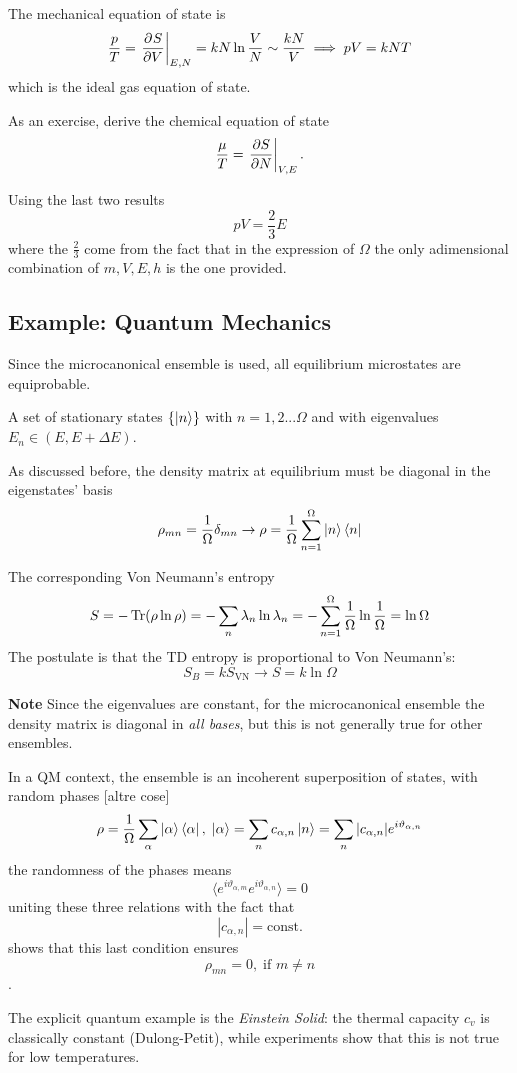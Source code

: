 The mechanical equation of state is
$$\frac{p}{T}=\eval{\pdv[]{S}{V}}_{E,N} = kN\ln \frac{V}{N}\sim \frac{kN}{V}
\implies pV = kNT$$
which is the ideal gas equation of state.

As an exercise, derive the chemical equation of state
$$\frac{\mu}{T} = \eval{\pdv{S}{N}}_{V,E}.$$

Using the last two results
$$pV = \frac{2}{3}E$$
where the $\frac{2}{3}$ come from the fact that in the expression of $\Omega$ the
only adimensional combination of $m,V,E,h$ is the one provided.
\subsection{Example: Quantum Mechanics}
Since the microcanonical ensemble is used, all equilibrium microstates are
equiprobable.

A set of stationary states $\left\{\ket{n}\right\}$ with $n=1,2...\Omega$ and
with eigenvalues $E_n\in\left(E,E+\Delta E\right)$.

As discussed before, the density matrix at equilibrium must be diagonal in the
eigenstates' basis
$$\rho_{mn} = \frac{1}{\Omega}\delta_{mn}\to \rho = \frac{1}{\Omega}
\sum_{n=1}^{\Omega}\ket{n}\bra{n}$$ 

The corresponding Von Neumann's entropy
$$S = -\Tr(\rho\ln\rho) = -\sum_{n}^{}\lambda_n\ln\lambda_n = 
-\sum_{n=1}^{\Omega}\frac{1}{\Omega}\ln\frac{1}{\Omega} = \ln\Omega $$
The postulate is that the TD entropy is proportional to Von Neumann's:
$$S_B = kS_\text{VN}\to S = k\ln\Omega$$

\textbf{Note} Since the eigenvalues are constant, for the microcanonical ensemble
the density matrix is diagonal in \textit{all bases}, but this is not generally
true for other ensembles.

In a QM context, the ensemble is an incoherent superposition of states, with
random phases [altre cose]
$$\rho = \frac{1}{\Omega} \sum_{\alpha}^{}\ket{\alpha}\bra{\alpha},\;\ket{\alpha}
=\sum_{n}^{} c_{\alpha,n}\ket{n} = \sum_{n}^{}|c_{\alpha,n}|
e^{i\vartheta_{\alpha,n}}$$
the randomness of the phases means
$$\langle e^{i\vartheta_{\alpha,m}}e^{i\vartheta_{\alpha,n}}\rangle =0$$
uniting these three relations with the fact that
$$\left|c_{\alpha,n}\right|=\text{const.}$$
shows that this last condition ensures
$$\rho_{mn} = 0,\;\text{if }m\neq n$$.

The explicit quantum example is the \textit{Einstein Solid}: the thermal capacity
$c_v$ is classically constant (Dulong-Petit), while experiments show that this is
not true for low temperatures.

